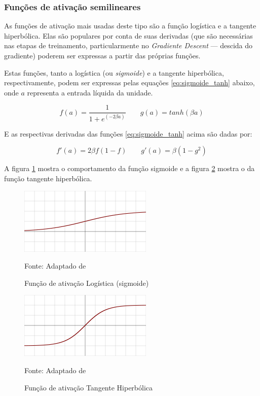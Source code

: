 \subsubsection{Funções de ativação semilineares}\label{ativacao_semilinear}
As funções de ativação mais usadas deste tipo são a função logística e a tangente hiperbólica. Elas são populares por conta de suas derivadas (que são necessárias nas etapas de treinamento, particularmente no \textit{Gradiente Descent} --- descida do gradiente) poderem ser expressas a partir das próprias funções.

Estas funções, tanto a logística (ou \textit{sigmoide}) e a tangente hiperbólica, respectivamente, podem ser expressas pelas equações \ref{eq:sigmoide_tanh} abaixo, onde $a$ representa a entrada líquida da unidade. \cite{haykin_redes_2001} \cite{lima_ia_2016} 

\begin{equation}\label{eq:sigmoide_tanh}
	f(a) = \frac{1}{1+ e^{(-2 \beta a)}} \qquad g(a) = tanh(\beta a)
\end{equation}

E as respectivas derivadas das funções \ref{eq:sigmoide_tanh} acima são dadas por:

\begin{equation}\label{derivadas_sigmoide_tanh}
	f'(a) = 2 \beta f(1-f) \qquad g'(a) = \beta (1-g^2)
\end{equation}

A figura \ref{fig:ativacao_sigmoide} mostra o comportamento da função sigmoide e a figura \ref{fig:tanh} mostra o da função tangente hiperbólica.

\begin{figure}[h!]
	\centering
	\includegraphics[width=.5\textwidth]{imagens/logistic.png}	
	\caption{Função de ativação Logística (sigmoide)}
	{\scriptsize 	Fonte: Adaptado de \cite{haykin_redes_2001}}
	\label{fig:ativacao_sigmoide}
\end{figure}

\begin{figure}[h!]
	\centering
	\includegraphics[width=.5\textwidth]{imagens/tanh.png}	
	\caption{Função de ativação Tangente Hiperbólica}
	{\scriptsize 	Fonte: Adaptado de \cite{haykin_redes_2001}}
	\label{fig:tanh}
\end{figure}

